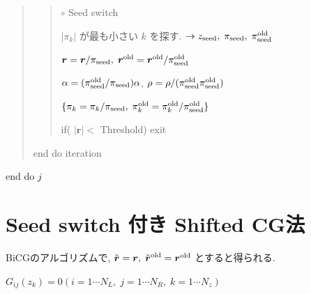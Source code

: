 \documentclass[letterpaper,10pt,dvipdfmx,openany]{sphinxmanual}
\begin{document}
\begin{quote}
\begin{quote}
\(\circ\) Seed switch

\(|\pi_k|\) が最も小さい \(k\) を探す. \(\rightarrow z_{\rm seed},\; \pi_{\rm seed},\; \pi_{\rm seed}^{\rm old}\)

\({\boldsymbol r} = {\boldsymbol r} / \pi_{\rm seed},\; {\boldsymbol r}^{\rm old} = {\boldsymbol r}^{\rm old} / \pi_{\rm seed}^{\rm old}\)

\(\alpha = (\pi_{\rm seed}^{\rm old} / \pi_{\rm seed}) \alpha\), \(\rho = \rho / (\pi_{\rm seed}^{\rm old} \pi_{\rm seed}^{\rm old})\)

\(\{\pi_k = \pi_k/\pi_{\rm seed},\; \pi_k^{\rm old} = \pi_k^{\rm old} / \pi_{\rm seed}^{\rm old}\}\)

if( \(|{\boldsymbol r}| <\) Threshold) exit
\end{quote}

end do iteration
\end{quote}

end do \(j\)


\section{Seed switch 付き Shifted CG法}
\label{komega_algorithm_ja:seed-switch-shifted-cg}
BiCGのアルゴリズムで,
\({\tilde {\boldsymbol r}} = {\boldsymbol r},\; {\tilde {\boldsymbol r}}^{\rm old} = {\boldsymbol r}^{\rm old}\) とすると得られる.

\(G_{i j}(z_k) = 0 (i=1 \cdots N_L,\; j = 1 \cdots N_R,\; k=1 \cdots N_z)\)
\end{document}
